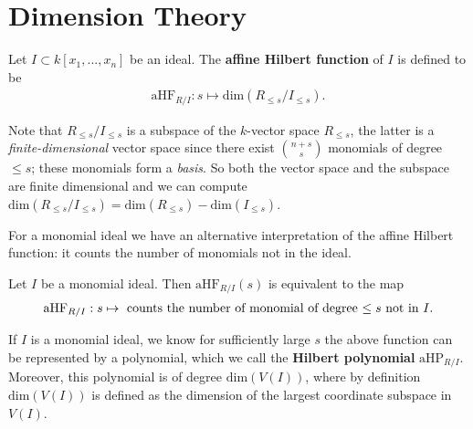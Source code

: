 \section{Dimension Theory}

\begin{defi}
  Let \( I \subset k[x_1,...,x_n] \) be an ideal. The \textbf{affine Hilbert function} of \( I \) is defined to be
  \begin{align*}
    \mathrm{aHF} _{R/I}:
    s \mapsto \mathrm{dim}\left( R_{\leq s} / I_{\leq s} \right).
  \end{align*}
\end{defi}

\begin{remark}
  Note that \( R_{\leq s} / I_{\leq s} \) is a subspace of the \( k \)-vector space \( R_{\leq s} \), the latter is a \emph{finite-dimensional} vector space since there exist \( {n + s  \choose s} \) monomials of degree \( \leq s \); these monomials form a \emph{basis}. So both the vector space and the subspace are finite dimensional and we can compute \( \mathrm{dim}\left( R_{\leq s} / I_{\leq s} \right) = \mathrm{dim}\left( R_{\leq s} \right) - \mathrm{dim}(I_{\leq s} ) \).
\end{remark}

For a monomial ideal we have an alternative interpretation of the affine Hilbert function: it counts the number of monomials not in the ideal.

\begin{prop}
  Let \( I \) be a monomial ideal. Then \( \mathrm{aHF}_{R / I}(s) \) is equivalent to the map 
  \begin{align*}
    \mathrm{aHF} _{R/I}:
    s \mapsto \text{  counts the number of monomial of degree \( \leq s \) not in \( I \)}.
  \end{align*}
\end{prop}

\begin{remark}
  If \( I \) is a monomial ideal, we know for sufficiently large \( s \) the above function can be represented by a polynomial, which we call the \textbf{Hilbert polynomial} \( \mathrm{aHP}_{R / I} \). Moreover, this polynomial is of degree \( \mathrm{dim}(V(I)) \), where by definition \( \mathrm{dim}(V(I)) \) is defined as the dimension of the largest coordinate subspace in \( V(I) \).
\end{remark}


